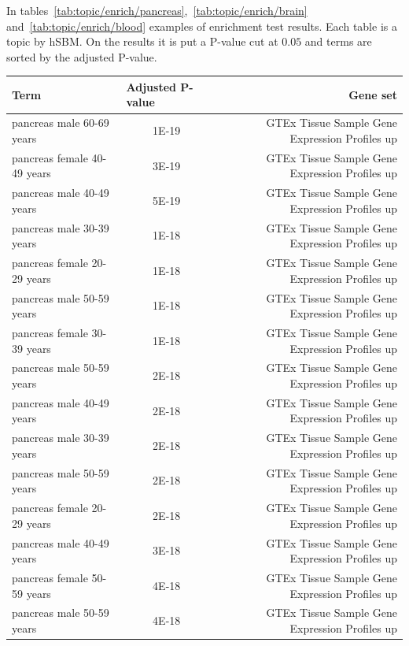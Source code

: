 In tables~\ref{tab:topic/enrich/pancreas},~\ref{tab:topic/enrich/brain} and~\ref{tab:topic/enrich/blood} examples of enrichment test results. Each table is a topic by hSBM. On the results it is put a P-value cut at $0.05$ and terms are sorted by the adjusted P-value.
\begin{table}[htb!]
	\tiny
	\begin{center}
		\begin{tabular}{|l|c|r|}
			\hline
			Term & \multicolumn{1}{l|}{Adjusted P-value} & Gene set \\ \hline
			pancreas male 60-69 years & 1E-19 & GTEx Tissue Sample Gene Expression Profiles up \\ \hline
			pancreas female 40-49 years & 3E-19 & GTEx Tissue Sample Gene Expression Profiles up \\ \hline
			pancreas male 40-49 years & 5E-19 & GTEx Tissue Sample Gene Expression Profiles up \\ \hline
			pancreas male 30-39 years & 1E-18 & GTEx Tissue Sample Gene Expression Profiles up \\ \hline
			pancreas female 20-29 years & 1E-18 & GTEx Tissue Sample Gene Expression Profiles up \\ \hline
			pancreas male 50-59 years & 1E-18 & GTEx Tissue Sample Gene Expression Profiles up \\ \hline
			pancreas female 30-39 years & 1E-18 & GTEx Tissue Sample Gene Expression Profiles up \\ \hline
			pancreas male 50-59 years & 2E-18 & GTEx Tissue Sample Gene Expression Profiles up \\ \hline
			pancreas male 40-49 years & 2E-18 & GTEx Tissue Sample Gene Expression Profiles up \\ \hline
			pancreas male 30-39 years & 2E-18 & GTEx Tissue Sample Gene Expression Profiles up \\ \hline
			pancreas male 50-59 years & 2E-18 & GTEx Tissue Sample Gene Expression Profiles up \\ \hline
			pancreas female 20-29 years & 2E-18 & GTEx Tissue Sample Gene Expression Profiles up \\ \hline
			pancreas male 40-49 years & 3E-18 & GTEx Tissue Sample Gene Expression Profiles up \\ \hline
			pancreas female 50-59 years & 4E-18 & GTEx Tissue Sample Gene Expression Profiles up \\ \hline
			pancreas male 50-59 years & 4E-18 & GTEx Tissue Sample Gene Expression Profiles up \\ \hline

\end{tabular}
\end{center}
\end{table}
